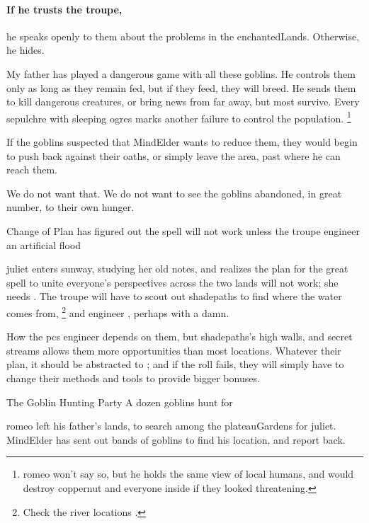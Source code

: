 \begin{multicols}{2}
\paragraph{If he trusts the troupe,}
he speaks openly to them about the problems in the \gls{enchantedLands}.
Otherwise, he hides.

\begin{speechtext}
  My father has played a dangerous game with all these goblins.
  He controls them only as long as they remain fed, but if they feed, they will breed.
  He sends them to kill dangerous creatures, or bring news from far away, but most survive.
  Every \gls{sepulchre} with sleeping \glspl{ogre} marks another failure to control the population.%
  \footnote{\Gls{romeo} won't say so, but he holds the same view of local humans, and would destroy \gls{coppernut} and everyone inside if they looked threatening.}

  If the goblins suspected that \gls{MindElder} wants to reduce them, they would begin to push back against their oaths, or simply leave the area, past where he can reach them.

  We do not want that.
  We do not want to see the goblins abandoned, in great number, to their own hunger.
\end{speechtext}

{Change of Plan}%
{ has figured out the spell will not work unless the troupe engineer an artificial \gls{flood}}%

\Gls{juliet} enters \gls{sunway}, studying her old notes, and realizes the plan for the great spell to unite everyone's perspectives across the two lands will not work; she needs .
The troupe will have to scout out \gls{shadepaths} to find where the water comes from,%
\footnote{Check the river locations .}
and engineer , perhaps with a damn.

How the \glspl{pc} engineer  depends on them, but \gls{shadepaths}'s high walls, and secret streams allows them more opportunities than most locations.
Whatever their plan, it should be abstracted to ; and if the roll fails, they will simply have to change their methods and tools to provide bigger bonuses.

{The Goblin Hunting Party}%
{A dozen goblins hunt for }%

\Gls{romeo} left his father's lands, to search among the \gls{plateauGardens} for \gls{juliet}.
\Gls{MindElder} has sent out bands of goblins to find his location, and report back.


\end{multicols}
